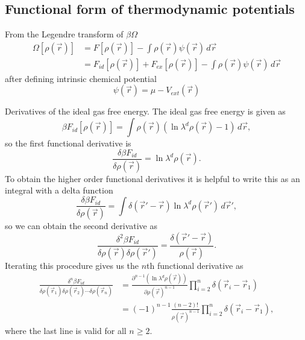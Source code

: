\documentclass[12pt]{report}
\begin{document}
\subsection{Functional form of thermodynamic potentials}

From the Legendre transform of $\beta \Omega$
\begin{equation}
  \begin{aligned}
    \Omega[\rho(\vec{r})] &=
    F[\rho(\vec{r})] -
    \int \rho(\vec{r}) \psi(\vec{r}) \, d\vec{r} \\
    &=
    F_{id}[\rho(\vec{r})] +
    F_{ex}[\rho(\vec{r})] -
    \int \rho(\vec{r}) \psi(\vec{r}) \, d\vec{r}
  \end{aligned}
\end{equation}
after defining intrinsic chemical potential
\begin{equation}\label{eq:intrinsic-chemical-potential}
  \psi(\vec{r}) = \mu - V_{ext}(\vec{r})
\end{equation}

Derivatives of the ideal gas free energy.
The ideal gas free energy is given as
\begin{equation*}
  \beta F_{id}[\rho(\vec{r})] =
  \int \rho(\vec{r}) (\ln{\lambda^d \rho(\vec{r})} - 1) \, d\vec{r},
\end{equation*}
so the first functional derivative is
\begin{equation*}
  \frac{\delta \beta F_{id}}{\delta \rho(\vec{r})} =
  \ln{\lambda^d \rho(\vec{r})}.
\end{equation*}
To obtain the higher order functional derivatives it is helpful to write this as an integral with a delta function
\begin{equation*}
  \frac{\delta \beta F_{id}}{\delta \rho(\vec{r})} =
  \int \delta{(\vec{r}' - \vec{r})}
  \ln{\lambda^d \rho(\vec{r}')} \, d\vec{r}',
\end{equation*}
so we can obtain the second derivative as
\begin{equation*}
  \frac{\delta^2 \beta F_{id}}{\delta \rho(\vec{r}) \delta \rho(\vec{r}')} =
  \frac{\delta(\vec{r}'-\vec{r})}{\rho(\vec{r})}.
\end{equation*}
Iterating this procedure gives us the $n$th functional derivative as
\begin{equation}
  \begin{aligned}
    \frac{\delta^n \beta F_{id}}{\delta \rho(\vec{r}_1) \delta \rho(\vec{r}_2) \cdots \delta \rho(\vec{r}_n)} &=
    \frac{\partial^{n-1} (\ln{\lambda^d \rho(\vec{r})})}{\partial \rho(\vec{r})^{n-1}}
    \prod_{i=2}^n \delta(\vec{r}_i - \vec{r}_1) \\
    &=
    (-1)^{n-1}
    \frac{(n-2)!}{\rho(\vec{r})^{n-1}}
    \prod_{i=2}^n \delta(\vec{r}_i - \vec{r}_1),
  \end{aligned}
\end{equation}
where the last line is valid for all $n \ge 2$.
\end{document}
